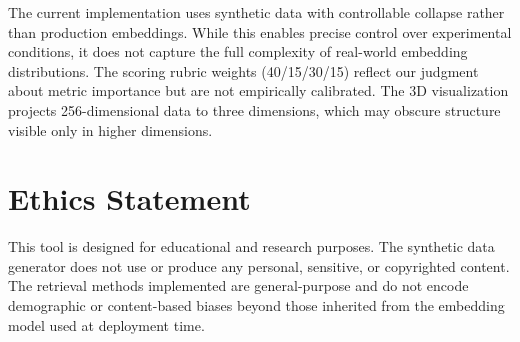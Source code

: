 \documentclass[11pt]{article}
\begin{document}
The current implementation uses synthetic data with controllable collapse rather than production embeddings. While this enables precise control over experimental conditions, it does not capture the full complexity of real-world embedding distributions. The scoring rubric weights (40/15/30/15) reflect our judgment about metric importance but are not empirically calibrated. The 3D visualization projects 256-dimensional data to three dimensions, which may obscure structure visible only in higher dimensions.

\section*{Ethics Statement}

This tool is designed for educational and research purposes. The synthetic data generator does not use or produce any personal, sensitive, or copyrighted content. The retrieval methods implemented are general-purpose and do not encode demographic or content-based biases beyond those inherited from the embedding model used at deployment time.


\end{document}
